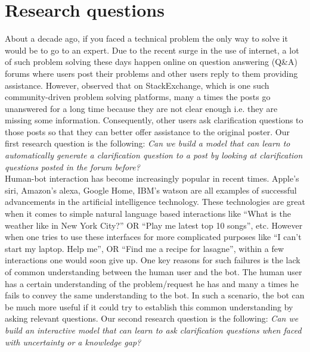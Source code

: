 \documentclass[11pt]{report}
\newcommand\newcite{\citet}	%
\begin{document}
\section{Research questions}

About a decade ago, if you faced a technical problem the only way to solve it would be to go to an expert. Due to the recent surge in the use of internet, a lot of such problem solving these days happen online on question answering (Q\&A) forums where users post their problems and other users reply to them providing assistance. However, \newcite{asaduzzaman2013answering} observed that on StackExchange, which is one such community-driven problem solving platforms, many a times the posts go unanswered for a long time because they are not clear enough i.e. they are missing some information. Consequently, other users ask clarification questions to those posts so that they can better offer assistance to the original poster. Our first research question is the following: \textit{Can we build a model that can learn to automatically generate a clarification question to a post by looking at clarification questions posted in the forum before?}\\

\noindent
Human-bot interaction has become increasingly popular in recent times. Apple's siri, Amazon's alexa, Google Home, IBM's watson are all examples of successful advancements in the artificial intelligence technology. These technologies are great when it comes to simple natural language based interactions like ``What is the weather like in New York City?'' OR ``Play me latest top 10 songs'', etc. However when one tries to use these interfaces for more complicated purposes like ``I can't start my laptop. Help me\!'', OR ``Find me a recipe for lasagne'', within a few interactions one would soon give up. One key reasons for such failures is the lack of common understanding between the human user and the bot. The human user has a certain understanding of the problem/request he has and many a times he fails to convey the same understanding to the bot. In such a scenario, the bot can be much more useful if it could try to establish this common understanding by asking relevant questions. Our second research question is the following: \textit{Can we build an interactive model that can learn to ask clarification questions when faced with uncertainty or a knowledge gap?}\\

\noindent
\end{document}
